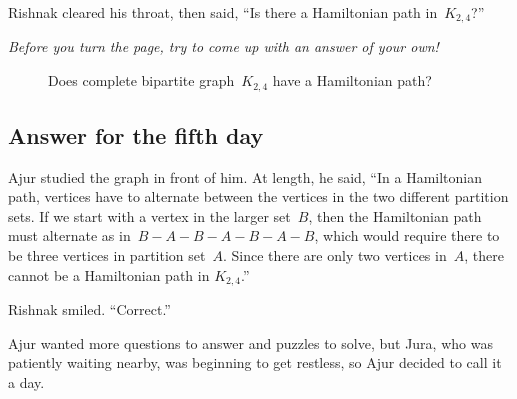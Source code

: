 Rishnak cleared his throat, then said, ``Is there a Hamiltonian path in~$K_{2,4}$?''

\textit{Before you turn the page, try to come up with an answer of your own!}

\begin{figure}
\begin{center}
\caption{Does complete bipartite graph~$K_{2,4}$ have a Hamiltonian path?}\label{5q1}
\end{center}
\end{figure}

\newpage
\subsection*{Answer for the fifth day}
Ajur studied the graph in front of him.  At length, he said, ``In a Hamiltonian path, vertices have to alternate between the vertices in the two different partition sets. If we start with a vertex in the larger set~$B$, then the Hamiltonian path must alternate as in~$B-A-B-A-B-A-B$, which would require there to be three vertices in partition set~$A$. Since there are only two vertices in~$A$, there cannot be a Hamiltonian path in $K_{2,4}$.''

Rishnak smiled. ``Correct.''

Ajur wanted more questions to answer and puzzles to solve, but Jura, who was patiently waiting nearby, was beginning to get restless, so Ajur decided to call it a day.
